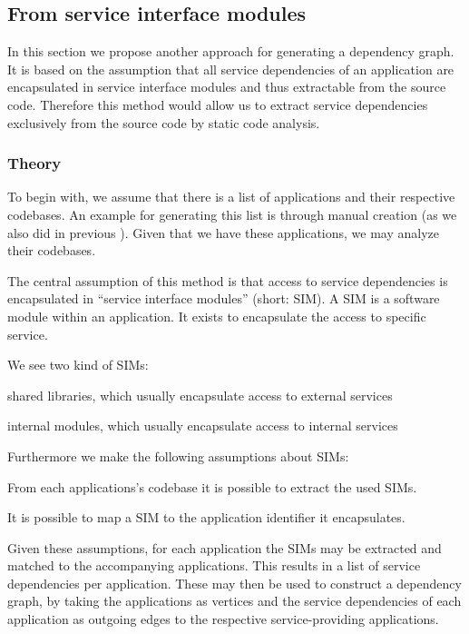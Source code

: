 \subsection{From service interface modules}
\label{subsec:from_smi}

In this section we propose another approach for generating a dependency graph. It is based on the assumption that all service dependencies of an application are encapsulated in service interface modules and thus extractable from the source code. Therefore this method would allow us to extract service dependencies exclusively from the source code by static code analysis.

\subsubsection{Theory}

To begin with, we assume that there is a list of applications and their respective codebases. An example for generating this list is through manual creation (as we also did in previous ). Given that we have these applications, we may analyze their codebases.

The central assumption of this method is that access to service dependencies is encapsulated in ``service interface modules'' (short: SIM). A SIM is a software module within an application. It exists to encapsulate the access to specific service.

We see two kind of SIMs:
\begin{tenumerate}
  \item shared libraries, which usually encapsulate access to external services
  \item internal modules, which usually encapsulate access to internal services
\end{tenumerate}

Furthermore we make the following assumptions about SIMs:
\begin{titemize}
  \item From each applications's codebase it is possible to extract the used SIMs.
  \item It is possible to map a SIM to the application identifier it encapsulates.
\end{titemize}

Given these assumptions, for each application the SIMs may be extracted and matched to the accompanying applications. This results in a list of service dependencies per application. These may then be used to construct a dependency graph, by taking the applications as vertices and the service dependencies of each application as outgoing edges to the respective service-providing applications.

